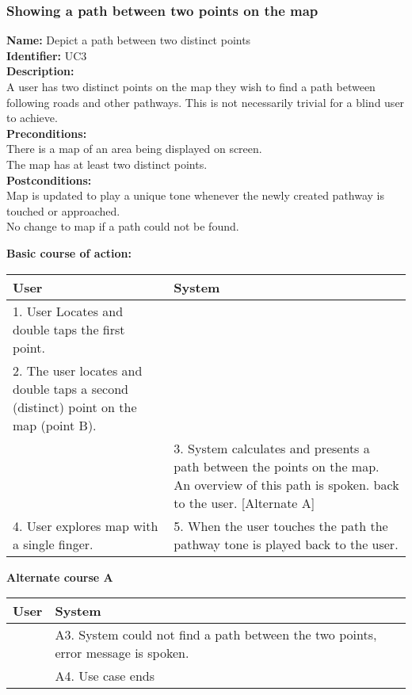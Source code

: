 \documentclass[11pt,twoside,a4paper]{article}
\begin{document}
\subsubsection{Showing a path between two points on the map}
\noindent
\textbf{Name:} Depict a path between two distinct points\\
\textbf{Identifier:} UC3\\
\textbf{Description:}\\
A user has two distinct points on the map they wish to find a path
between following roads and other pathways. This is not necessarily
trivial for a blind user to achieve.\\
\textbf{Preconditions:}\\
There is a map of an area being displayed on screen.\\
The map has at least two distinct points.\\
\textbf{Postconditions:}\\
Map is updated to play a unique tone whenever the newly created pathway
is touched or approached.\\
No change to map if a path could not be found.

\noindent
\textbf{Basic course of action:}\\
\begin{tabularx}{\textwidth}{ |X|X| }
  \textbf{User} & \textbf{System}\\
  \hline
  1. User Locates and double taps the first point. &
  \\
  \hline
  2. The user locates and double taps a second (distinct) point on the map (point B). & \\
  \hline
  & 3. System calculates and presents a path between the points on the
  map. An overview of this path is spoken. back to the user. [Alternate A]\\
  \hline
  4. User explores map with a single finger. & 5. When the user touches
  the path the pathway tone is played back to the user.\\
  \hline
\end{tabularx}

\noindent
\textbf{Alternate course A}\\
\begin{tabularx}{\textwidth}{ |X|X| }
  \textbf{User} & \textbf{System}\\
  \hline
  & A3. System could not find a path between the two points, error
  message is spoken.\\
  \hline
  & A4. Use case ends\\
  \hline
\end{tabularx}
\end{document}
